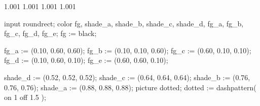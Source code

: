     {1.001}
 {1.001}
   {1.001}
      {1.001}

\let\center\raggedcenter

%
%

\startMPinclusions[+]
input roundrect;
color fg, shade_a, shade_b, shade_c, shade_d, fg_a, fg_b, fg_c, fg_d, fg_e;
fg := black;

fg_a := (0.10, 0.60, 0.60);
fg_b := (0.10, 0.10, 0.60);
fg_c := (0.60, 0.10, 0.10);
fg_d := (0.10, 0.60, 0.10);
fg_e := (0.60, 0.60, 0.10);

shade_d := (0.52, 0.52, 0.52);
shade_c := (0.64, 0.64, 0.64);
shade_b := (0.76, 0.76, 0.76);
shade_a := (0.88, 0.88, 0.88);
picture dotted;
dotted := dashpattern( on 1 off 1.5 );
\stopMPinclusions
